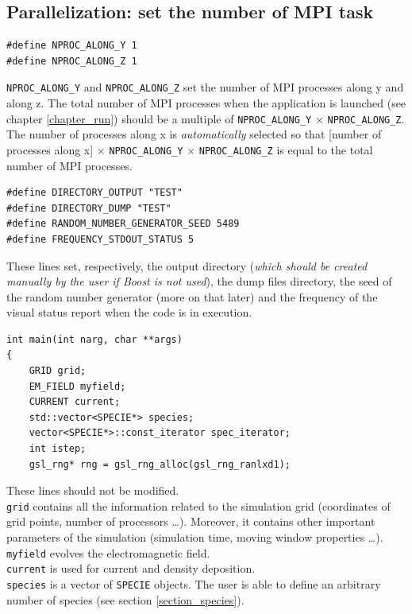 \documentclass[11pt,a4paper]{report}
\begin{document}
\subsection*{Parallelization: set the number of MPI task}
\begin{lstlisting}
#define NPROC_ALONG_Y 1
#define NPROC_ALONG_Z 1
\end{lstlisting}
\verb+NPROC_ALONG_Y+ and \verb+NPROC_ALONG_Z+ set the number of MPI processes along y and along z. 
The total number of MPI processes when the application is launched (see chapter \ref{chapter_run}) should be a multiple of \verb+NPROC_ALONG_Y+ $\times$ \verb+NPROC_ALONG_Z+. The number of processes along x is \emph{automatically} selected so that [number of processes along x] $\times$ \verb+NPROC_ALONG_Y+ $\times$ \verb+NPROC_ALONG_Z+ is equal to the total number of MPI processes.
\begin{lstlisting}
#define DIRECTORY_OUTPUT "TEST"
#define DIRECTORY_DUMP "TEST"
#define RANDOM_NUMBER_GENERATOR_SEED 5489
#define FREQUENCY_STDOUT_STATUS 5
\end{lstlisting}
These lines set, respectively, the output directory (\emph{which should be created manually by the user if Boost is not used}), the dump files directory, the seed of the random number generator (more on that later) and the frequency of the visual status report when the code is in execution.
\begin{lstlisting}[backgroundcolor=\color{no_modify}]
int main(int narg, char **args)
{
	GRID grid;
	EM_FIELD myfield;
	CURRENT current;
	std::vector<SPECIE*> species;
	vector<SPECIE*>::const_iterator spec_iterator;
	int istep;
	gsl_rng* rng = gsl_rng_alloc(gsl_rng_ranlxd1);
\end{lstlisting}
These lines should not be modified. \\
\verb+grid+ contains all the information related to the simulation grid (coordinates of grid points, number of processors \ldots). Moreover, it contains other important parameters of the simulation (simulation time, moving window properties \ldots).\\
\verb+myfield+ evolves the electromagnetic field.\\
\verb+current+ is used for current and density deposition.\\
\verb+species+ is a vector of \verb+SPECIE+ objects. The user is able to define an arbitrary number of species (see section \ref{section_species}).
\end{document}

